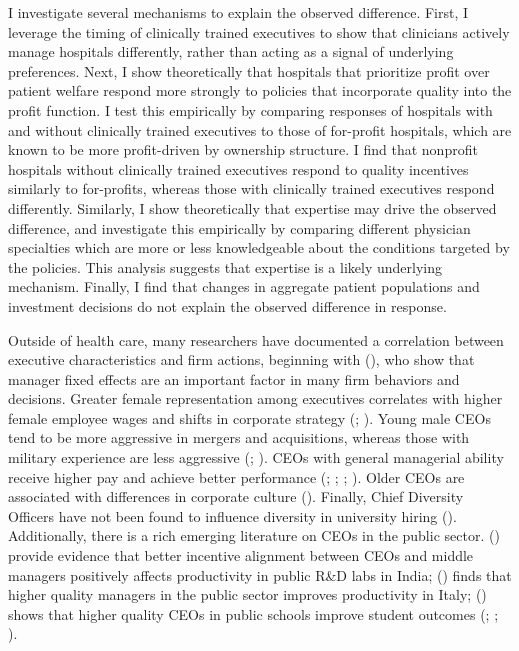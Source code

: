 \documentclass[12pt]{article}
\begin{document}
    I investigate several mechanisms to explain the observed difference. First, I leverage the timing of clinically trained executives to show that clinicians actively manage hospitals differently, rather than acting as a signal of underlying preferences. Next, I show theoretically that hospitals that prioritize profit over patient welfare respond more strongly to policies that incorporate quality into the profit function. I test this empirically by comparing responses of hospitals with and without clinically trained executives to those of for-profit hospitals, which are known to be more profit-driven by ownership structure. I find that nonprofit hospitals without clinically trained executives respond to quality incentives similarly to for-profits, whereas those with clinically trained executives respond differently. Similarly, I show theoretically that expertise may drive the observed difference, and investigate this empirically by comparing different physician specialties which are more or less knowledgeable about the conditions targeted by the policies. This analysis suggests that expertise is a likely underlying mechanism. Finally, I find that changes in aggregate patient populations and investment decisions do not explain the observed difference in response.

    Outside of health care, many researchers have documented a correlation between executive characteristics and firm actions, beginning with \citeauthor{bertrand2003managing} (\citeyear{bertrand2003managing}), who show that manager fixed effects are an important factor in many firm behaviors and decisions. Greater female representation among executives correlates with higher female employee wages and shifts in corporate strategy (\cite{flabbi2019female}; \cite{matsa2013female}). Young male CEOs tend to be more aggressive in mergers and acquisitions, whereas those with military experience are less aggressive (\cite{levi2010deal}; \cite{benmelech2015military}). CEOs with general managerial ability receive higher pay and achieve better performance (\cite{kaplan2012ceo}; \cite{custodio2013generalists}; \cite{adams2018director}; \cite{frydman2019rising}). Older CEOs are associated with differences in corporate culture (\cite{graham2022corporate}). Finally, Chief Diversity Officers have not been found to influence diversity in university hiring (\cite{bradley2022impact}). Additionally, there is a rich emerging literature on CEOs in the public sector. \citeauthor{choudhury2020managers} (\citeyear{choudhury2020managers}) provide evidence that better incentive alignment between CEOs and middle managers positively affects productivity in public R\&D labs in India; \citeauthor{fenizia2022managers} (\citeyear{fenizia2022managers}) finds that higher quality managers in the public sector improves productivity in Italy; \citeauthor{lavy2023effects} (\citeyear{lavy2023effects}) shows that higher quality CEOs in public schools improve student outcomes (\cite{choudhury2020managers}; \cite{fenizia2022managers}; \cite{lavy2023effects}). 
    
\end{document}
